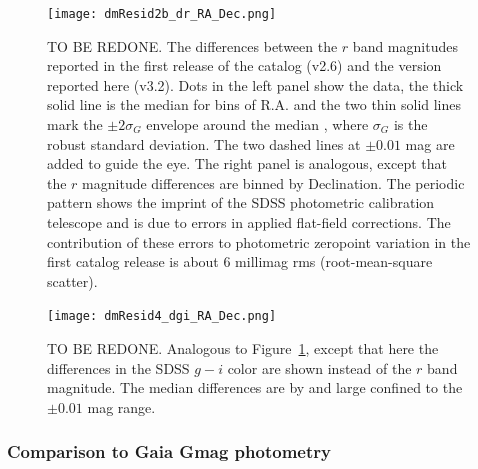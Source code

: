 \begin{figure}[t]
\centering
\texttt{[image: dmResid2b\_dr\_RA\_Dec.png]}
\caption{TO BE REDONE. The differences between the $r$ band magnitudes reported in the
first release of the catalog (v2.6) and the version reported here (v3.2). Dots in the left panel
show the data, the thick solid line is the median for bins of R.A. and the two thin solid lines
mark the $\pm 2 \sigma_G$ envelope around the median , where $\sigma_G$ is the robust standard 
deviation. The two dashed lines at $\pm 0.01$ mag are added to guide the eye. The right panel
is analogous, except that the $r$ magnitude differences are binned by Declination. The periodic
pattern shows the imprint of the SDSS photometric calibration telescope and is due to errors in 
applied flat-field corrections. The contribution of these errors to photometric zeropoint variation 
in the first catalog release is about 6 millimag rms (root-mean-square scatter). 
\label{fig:dmResid2b_dr_RA_Dec}}
\end{figure}
   
 
\begin{figure}[t]
\centering
\texttt{[image: dmResid4\_dgi\_RA\_Dec.png]}
\caption{TO BE REDONE.  Analogous to Figure~\ref{fig:dmResid2b_dr_RA_Dec}, except that here 
the differences in the SDSS $g-i$ color are shown instead of the $r$ band magnitude. 
The median differences are by and large confined to the $\pm 0.01$ mag range. 
\label{fig:dmResid4_dgi_RA_Dec}}
\end{figure}
  
  

\subsubsection{Comparison to Gaia Gmag photometry} 


